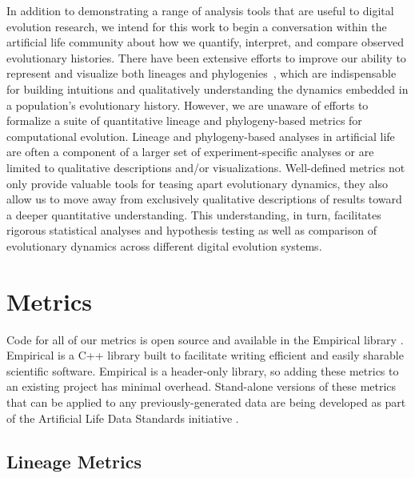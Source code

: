 \documentclass[letterpaper]{article}
\begin{document}
In addition to demonstrating a range of analysis tools that are useful to digital evolution research, we intend for this work to begin a conversation within the artificial life community about how we quantify, interpret, and compare observed evolutionary histories. There have been extensive efforts to improve our ability to represent and visualize both lineages and phylogenies~\citep{standish_visualising_2002,burlacu_visualization_2013, mcphee_using_2016,mcphee_visualizing_2016, lalejini_evolutionary_2016}, which are indispensable for building intuitions and qualitatively understanding the dynamics embedded in a population's evolutionary history. However, we are unaware of efforts to formalize a suite of quantitative lineage and phylogeny-based metrics for computational evolution. Lineage and phylogeny-based analyses in artificial life are often a component of a larger set of experiment-specific analyses or are limited to qualitative descriptions and/or visualizations. Well-defined metrics not only provide valuable tools for teasing apart evolutionary dynamics, they also allow us to move away from exclusively qualitative descriptions of results toward a deeper quantitative understanding. This understanding, in turn, facilitates rigorous statistical analyses and hypothesis testing as well as comparison of evolutionary dynamics across different digital evolution systems.


\section{Metrics}

Code for all of our metrics is open source and available in the Empirical library \citep{charles_ofria_2019_2575607}. Empirical is a C++ library built to facilitate writing efficient and easily sharable scientific software. Empirical is a header-only library, so adding these metrics to an existing project has minimal overhead. Stand-alone versions of these metrics that can be applied to any previously-generated data are being developed as part of the Artificial Life Data Standards initiative \citep{standards_github_repo}.

\subsection{Lineage Metrics}
\end{document}
